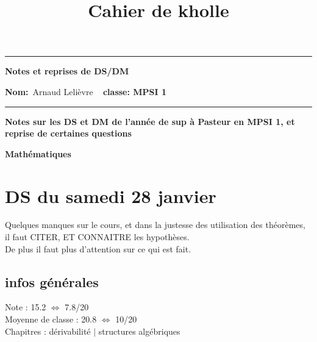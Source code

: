 \documentclass{book}
\title{Cahier de kholle}
\begin{document}
\begin{center}
  \hrule
	\vspace{.4cm}
	{\textbf{\large Notes et reprises de DS/DM}}
\end{center}

{\textbf{Nom:}\ Arnaud Lelièvre \hspace{\fill} \vspace{0.5cm}}
{\textbf{}\  \hspace{\fill} \vspace{0.5cm}}
{\textbf{classe: MPSI 1}\ \hspace{\fill}}
\hrule
\date{}

\vspace{1cm}

\begin{center}
\textbf{\large Notes sur les DS et DM de l'année de sup à Pasteur en MPSI 1, et reprise de certaines questions}
\end{center}

\vspace{0.6cm}


\begin{center}
\textbf{\large Mathématiques}
\end{center} \vspace{0.2cm}



\section{DS du samedi 28 janvier}

\begin{tcolorbox}[width={14cm},colback={yellow!20!white},title={\textbf{Commentaire générale sur ce DS}},colbacktitle=red!40!white,coltitle=black]    
	Quelques manques sur le cours, et dans la justesse des utilisation des théorèmes, il faut CITER, ET CONNAITRE les hypothèses. \\
	De plus il faut plus d'attention sur ce qui est fait.
\end{tcolorbox}

\subsection{infos générales}

Note : 15.2 $\Leftrightarrow$ 7.8/20\\
Moyenne de classe : 20.8 $\Leftrightarrow$ 10/20 \\

Chapitres : dérivabilité $|$ structures algébriques \\ \\
\end{document}
